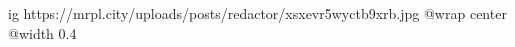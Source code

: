  
 
 
 
 

\ifcmt
  ig https://mrpl.city/uploads/posts/redactor/xsxevr5wyctb9xrb.jpg
  @wrap center
  @width 0.4
\fi
